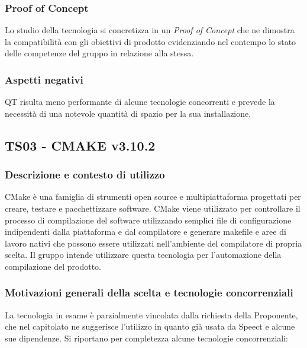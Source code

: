 \documentclass[./../Technology Baseline.tex]{subfiles}
\begin{document}
\subsubsection{Proof of Concept}
Lo studio della tecnologia si concretizza in un \textit{Proof of Concept} che ne dimostra la compatibilità con gli obiettivi di prodotto evidenziando nel contempo lo stato delle competenze del gruppo in relazione alla stessa.

\subsubsection{Aspetti negativi}
QT risulta meno performante di alcune tecnologie concorrenti e prevede la necessità di una notevole quantità di spazio per la sua installazione.

\subsection{TS03 - CMAKE v3.10.2}

\subsubsection{Descrizione e contesto di utilizzo}
CMake è una famiglia di strumenti open source e multipiattaforma progettati per creare, testare e pacchettizzare software. CMake viene utilizzato per controllare il processo di compilazione del software utilizzando semplici file di configurazione indipendenti dalla piattaforma e dal compilatore e generare makefile e aree di lavoro nativi che possono essere utilizzati nell'ambiente del compilatore di propria scelta. Il gruppo intende utilizzare questa tecnologia per l’automazione della compilazione del prodotto.

\subsubsection{Motivazioni generali della scelta e tecnologie concorrenziali}
La tecnologia in esame è parzialmente vincolata dalla richiesta della Proponente, che nel capitolato ne suggerisce l'utilizzo in quanto già
usata da Speect e alcune sue dipendenze. Si riportano per completezza alcune tecnologie concorrenziali:
\end{document}

